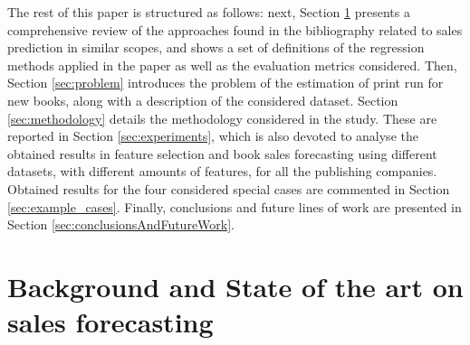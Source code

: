 \documentclass[a4paper,10pt,twocolumn,preprint,3p]{elsarticle}
\begin{document}


The rest of this paper is structured as follows: next, Section \ref{sec:soa} presents a comprehensive review of the approaches found in the bibliography related to sales prediction in similar scopes, and shows a set of definitions of the regression methods applied in the paper as well as the evaluation metrics considered.
Then, Section \ref{sec:problem} introduces the problem of the estimation of print run
for new books, along with a description of the considered dataset.
Section \ref{sec:methodology} details the methodology considered in the study. These are reported in Section \ref{sec:experiments}, which is also devoted to analyse the obtained results in feature selection and book sales forecasting using different datasets, with different amounts of features, for all the publishing companies. Obtained results for the four considered special cases are commented in Section \ref{sec:example_cases}. Finally, conclusions and future lines of work are presented in Section \ref{sec:conclusionsAndFutureWork}. 


\section{Background and State of the art on sales forecasting} 
\label{sec:soa}
\end{document}
